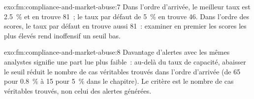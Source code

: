 \begin{solution}{exo:fm:compliance-and-market-abuse:7}
Dans l'ordre d'arrivée, le meilleur taux est 2.5~\% et en trouve 81~; le taux par défaut de 5~\% en trouve 46. Dans l'ordre des scores, le taux par défaut en trouve aussi 81~: examiner en premier
les scores les plus élevés rend inoffensif un seuil bas.
\end{solution}

\begin{solution}{exo:fm:compliance-and-market-abuse:8}
Davantage d'alertes avec les mêmes analystes signifie une part lue plus faible~: au-delà du taux de capacité, abaisser le seuil réduit le nombre de cas véritables trouvés dans
l'ordre d'arrivée (de 65 pour 0.8~\% à 15 pour 5~\% dans le chapitre). Le critère est le nombre de cas véritables trouvés, non celui des alertes générées.
\end{solution}

